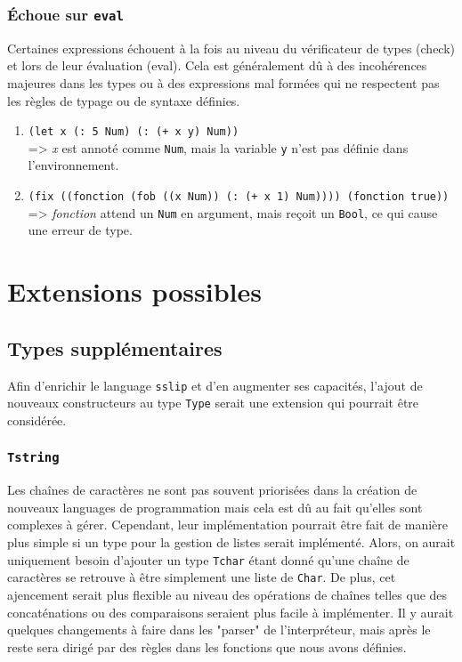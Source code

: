 \documentclass[a4paper,12pt]{article}
\begin{document}
        \subsubsection{Échoue sur \texttt{eval}}
        Certaines expressions échouent à la fois au niveau du vérificateur de types (check) et lors de leur évaluation (eval). 
        Cela est généralement dû à des incohérences majeures dans les types ou à des expressions mal formées qui ne respectent pas 
        les règles de typage ou de syntaxe définies. \\
        \begin{enumerate}
            \item \texttt{(let x (: 5 Num) (: (+ x y) Num))} \\[.5em]
            => \textit{x} est annoté comme \texttt{Num}, mais la variable \texttt{y} n'est pas définie dans l'environnement.
        
            \item \texttt{(fix ((fonction (fob ((x Num)) (: (+ x 1) Num)))) (fonction true))} \\[.5em]
            => \textit{fonction} attend un \texttt{Num} en argument, mais reçoit un \texttt{Bool}, ce qui cause une erreur de type.
        \end{enumerate}



\newpage
\section{Extensions possibles}
    \subsection{Types supplémentaires}
        Afin d'enrichir le language \texttt{sslip} et d'en augmenter ses capacités, l'ajout de 
        nouveaux constructeurs au type \texttt{Type} serait une extension qui pourrait être 
        considérée.
        \subsubsection{\texttt{Tstring}}
            Les chaînes de caractères ne sont pas souvent priorisées dans la création de nouveaux
            languages de programmation mais cela est dû au fait qu'elles sont complexes à gérer.
            Cependant, leur implémentation pourrait être fait de manière plus simple si un type
            pour la gestion de listes serait implémenté. Alors, on aurait uniquement besoin 
            d'ajouter un type \texttt{Tchar} étant donné qu'une chaîne de caractères se retrouve
            à être simplement une liste de \texttt{Char}. De plus, cet ajencement serait plus
            flexible au niveau des opérations de chaînes telles que des concaténations ou des 
            comparaisons seraient plus facile à implémenter. Il y aurait quelques changements 
            à faire dans les "parser" de l'interpréteur, mais après le reste sera dirigé par 
            des règles dans les fonctions que nous avons définies.
\end{document}
